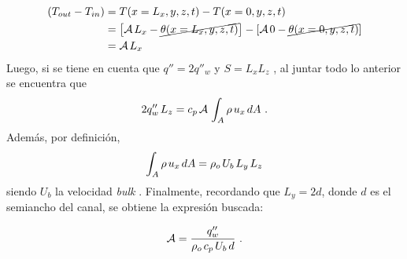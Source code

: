 \begin{equation*}
\begin{aligned}
\left( T_{out} - T_{in} \right) &= T(x=L_x,y,z,t) - T(x=0,y,z,t) \\
								&= \left[ \mathcal{A} \hspace{0.5mm} L_x - \cancel{\theta(x=L_x,y,z,t)} \right] -  \left[ \mathcal{A} \hspace{0.5mm} 0 - \cancel{\theta(x=0,y,z,t)} \right] \\
								&= \mathcal{A} \hspace{0.5mm} L_x
\end{aligned}
\end{equation*}
Luego, si se tiene en cuenta que $q''= 2 q''_w$ y  $S=L_x L_z$ , al juntar todo lo anterior se encuentra que 
$$ 2 q''_w \hspace{0.5mm} L_z = c_p \hspace{0.5mm} \mathcal{A}  \hspace{0.5mm} \int_A  \rho \hspace{0.5mm} u_x \hspace{0.5mm} dA \text{ .}$$
Además, por definición, 
$$ \int_A \rho \hspace{0.5mm} u_x  \hspace{0.5mm} dA = \rho_o \hspace{0.5mm} U_b \hspace{0.5mm} L_y \hspace{0.5mm} L_z$$
siendo $U_b$ la velocidad \textit{bulk} \cite{pope2001turbulent}. Finalmente, recordando que $L_y = 2 d$, donde $d$ es el semiancho del canal, se obtiene la expresión buscada:

\begin{equation}
\mathcal{A}=\frac{q''_w}{\rho_o \hspace{0.5mm} c_p \hspace{0.5mm} U_b \hspace{0.5mm} d } \text{ .}
\end{equation}

